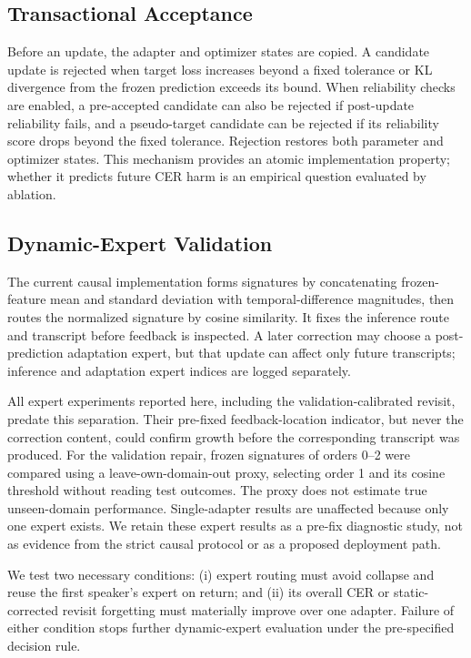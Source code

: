 \subsection{Transactional Acceptance}

Before an update, the adapter and optimizer states are copied. A candidate update is rejected when target loss increases beyond a fixed tolerance or KL divergence from the frozen prediction exceeds its bound. When reliability checks are enabled, a pre-accepted candidate can also be rejected if post-update reliability fails, and a pseudo-target candidate can be rejected if its reliability score drops beyond the fixed tolerance. Rejection restores both parameter and optimizer states. This mechanism provides an atomic implementation property; whether it predicts future CER harm is an empirical question evaluated by ablation.

\subsection{Dynamic-Expert Validation}

The current causal implementation forms signatures by concatenating frozen-feature mean and standard deviation with temporal-difference magnitudes, then routes the normalized signature by cosine similarity. It fixes the inference route and transcript before feedback is inspected. A later correction may choose a post-prediction adaptation expert, but that update can affect only future transcripts; inference and adaptation expert indices are logged separately.

All expert experiments reported here, including the validation-calibrated revisit, predate this separation. Their pre-fixed feedback-location indicator, but never the correction content, could confirm growth before the corresponding transcript was produced. For the validation repair, frozen signatures of orders 0--2 were compared using a leave-own-domain-out proxy, selecting order 1 and its cosine threshold without reading test outcomes. The proxy does not estimate true unseen-domain performance. Single-adapter results are unaffected because only one expert exists. We retain these expert results as a pre-fix diagnostic study, not as evidence from the strict causal protocol or as a proposed deployment path.

We test two necessary conditions: (i) expert routing must avoid collapse and reuse the first speaker's expert on return; and (ii) its overall CER or static-corrected revisit forgetting must materially improve over one adapter. Failure of either condition stops further dynamic-expert evaluation under the pre-specified decision rule.

